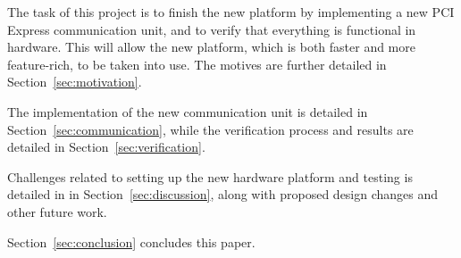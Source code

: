 The task of this project is to finish the new platform by implementing a new PCI Express communication unit, and to verify that everything is functional in hardware.
This will allow the new platform, which is both faster and more feature-rich, to be taken into use.
The motives are further detailed in Section~\ref{sec:motivation}.

The implementation of the new communication unit is detailed in Section~\ref{sec:communication}, while the verification process and results are detailed in Section~\ref{sec:verification}.

Challenges related to setting up the new hardware platform and testing is detailed in in Section~\ref{sec:discussion}, along with proposed design changes and other future work.

Section~\ref{sec:conclusion} concludes this paper.

